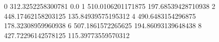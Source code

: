 0 312.3252258300781 0.0
1 510.0106201171875 197.68539428710938
2 448.17462158203125 135.84939575195312
4 490.6483154296875 178.32308959960938
6 507.1861572265625 194.86093139648438
8 427.72296142578125 115.39773559570312

